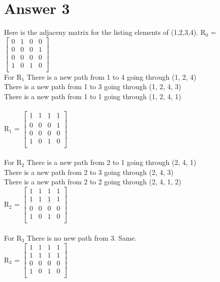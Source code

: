 \documentclass[12pt]{article}
\begin{document}
\section*{Answer 3}
 Here is the adjaceny matrix for the listing elements of (1,2,3,4).
 R$_0$ = $\begin{bmatrix}
       0 & 1 & 0 & 0\\
       0 & 0 & 0 & 1\\
       0 & 0 & 0 & 0\\
       1 & 0 & 1 & 0\\
     \end{bmatrix}$\\
 For R$_1$ There is a new path from 1 to 4 going through (1, 2, 4) \\
 There is a new path from 1 to 3 going through (1, 2, 4, 3) \\
 There is a new path from 1 to 1 going through (1, 2, 4, 1) \\
 \\
 R$_1$ = $\begin{bmatrix}
       \underline{1} & 1 & \underline{1} & \underline{1} \\
       0 & 0 & 0 & 1\\
       0 & 0 & 0 & 0\\
       1 & 0 & 1 & 0\\
     \end{bmatrix}$\\
     \\
 For R$_2$ There is a new path from 2 to 1 going through (2, 4, 1) \\
 There is a new path from 2 to 3 going through (2, 4, 3) \\
 There is a new path from 2 to 2 going through (2, 4, 1, 2) \\
 R$_2$ = $\begin{bmatrix}
       1 & 1 & 1 & 1\\
       \underline{1} & \underline{1} & \underline{1} & 1\\
       0 & 0 & 0 & 0\\
       1 & 0 & 1 & 0\\
     \end{bmatrix}$\\
     \\
 For R$_3$ There is no new path from 3. Same. \\
 R$_3$ = $\begin{bmatrix}
       1 & 1 & 1 & 1\\
       1 & 1 & 1 & 1\\
       0 & 0 & 0 & 0\\
       1 & 0 & 1 & 0\\
     \end{bmatrix}$\\
\end{document}
